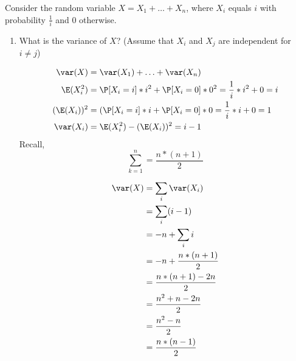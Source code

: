 \question Consider the random variable $X = X_1 + \dotsc + X_n$, 
where $X_i$ equals $i$ with probability $\frac{1}{i}$ and 0 otherwise. 
\begin{enumerate}[label=(\alph*)]
\item What is the variance of $X$? (Assume that $X_i$ and $X_j$ are 
independent for $i \neq j$)
\begin{solution}[4cm]
\begin{equation}
\begin{split}
\var(X) &= \var(X_1) + \dotsc + \var(X_n) \\ \nonumber
\E(X_i^2) &= \P[X_i = i]*i^2 +\P[X_i = 0]*0^2 = \frac{1}{i}*i^2 + 0 = i \\
(\E(X_i))^2 &= (\P[X_i = i]*i + \P[X_i = 0]*0 = \frac{1}{i}*i + 0 = 1 \\
\var(X_i) &= \E(X_i^2) - (\E(X_i))^2 = i - 1
\end{split}
\end{equation}
Recall, 
\[\sum_{k = 1}^{n} = \frac{n*(n + 1)}{2}\]

\begin{equation}
\begin{split}
\var(X) &= \sum_i \var(X_i) \\ \nonumber
&= \sum_i (i - 1) \\
&= -n + \sum_i i \\
&= -n + \frac{n * (n + 1)}{2} \\
&= \frac{n*(n + 1) - 2n}{2} \\
&= \frac{n^2 + n - 2n}{2} \\
&= \frac{n^2 - n}{2} \\
&= \frac{n*(n - 1)}{2}
\end{split}
\end{equation}
\end{solution}

\end{enumerate}